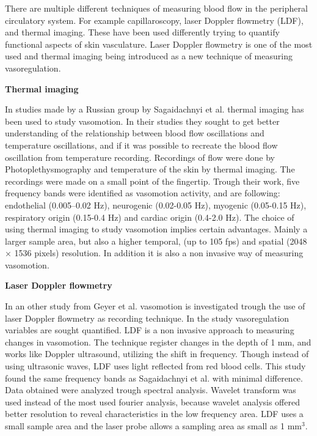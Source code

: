 There are multiple different techniques of measuring blood flow in the peripheral circulatory system. For example capillaroscopy, laser Doppler flowmetry (LDF), and thermal imaging. These have been used differently trying to quantify functional aspects of skin vasculature.\cite{liu2012} Laser Doppler flowmetry is one of the most used\cite{geyer2004} and thermal imaging being introduced as a new technique of measuring vasoregulation\cite{sagaidachnyi2014}.

\textbf{Thermal imaging}

In studies made by a Russian group by Sagaidachnyi et al. thermal imaging has been used to study vasomotion. In their studies they sought to get better understanding of the relationship between blood flow oscillations and temperature oscillations, and if it was possible to recreate the blood flow oscillation from temperature recording. Recordings of flow were done by Photoplethysmography and temperature of the skin by thermal imaging. The recordings were made on a small point of the fingertip. Trough their work, five frequency bands were identified as vasomotion activity, and are following: endothelial (0.005–0.02 Hz), neurogenic (0.02-0.05 Hz), myogenic (0.05-0.15 Hz), respiratory origin (0.15-0.4 Hz) and cardiac origin (0.4-2.0 Hz).\cite{sagaidachnyi2017,sagaidachnyi2014}
The choice of using thermal imaging to study vasomotion implies certain advantages. Mainly a larger sample area, but also a higher temporal, (up to 105 fps) and spatial (2048 × 1536 pixels) resolution. In addition it is also a non invasive way of measuring vasomotion.\cite{sagaidachnyi2017}





\textbf{Laser Doppler flowmetry}

In an other study from Geyer et al. vasomotion is investigated trough the use of laser Doppler flowmetry as recording technique. In the study vasoregulation variables are sought quantified. LDF is a non invasive approach to measuring changes in vasomotion. The technique register changes in the depth of 1 mm, and works like Doppler ultrasound, utilizing the shift in frequency. Though instead of using ultrasonic waves, LDF uses light reflected from red blood cells. This study found the same frequency bands as Sagaidachnyi et al. with minimal difference. Data obtained were analyzed trough spectral analysis. Wavelet transform was used instead of the most used fourier analysis, because wavelet analysis offered better resolution to reveal characteristics in the low frequency area.\cite{geyer2004}
LDF uses a small sample area and the laser probe allows a sampling area as small as 1 mm$^3$.\cite{brothers2010} 


